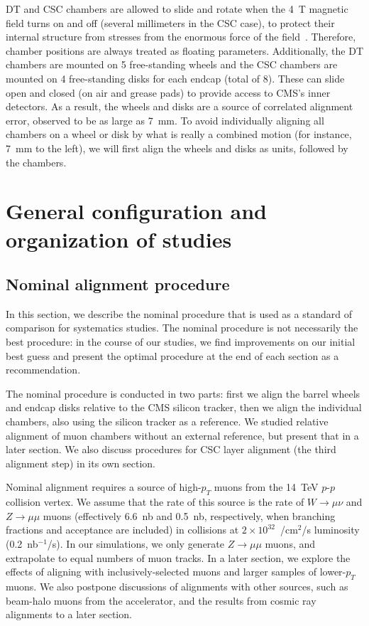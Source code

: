 \documentclass[12pt]{article}
\begin{document}
DT and CSC chambers are allowed to slide and rotate when the 4~T
magnetic field turns on and off (several millimeters in the CSC case),
to protect their internal structure from stresses from the enormous
force of the field~\cite{slide_in_field}.  Therefore, chamber
positions are always treated as floating parameters.  Additionally,
the DT chambers are mounted on 5 free-standing wheels and the CSC
chambers are mounted on 4 free-standing disks for each endcap (total
of 8).  These can slide open and closed (on air and grease pads) to
provide access to CMS's inner detectors.  As a result, the wheels and
disks are a source of correlated alignment error, observed to be
as large as 7~mm.  To avoid individually aligning all chambers on a
wheel or disk by what is really a combined motion (for instance, 7~mm
to the left), we will first align the wheels and disks as units,
followed by the chambers.

\section{General configuration and organization of studies}

\subsection{Nominal alignment procedure}

In this section, we describe the nominal procedure that is used as a
standard of comparison for systematics studies.  The nominal procedure
is not necessarily the best procedure: in the course of our studies,
we find improvements on our initial best guess and present the optimal
procedure at the end of each section as a recommendation.

The nominal procedure is conducted in two parts: first we align the
barrel wheels and endcap disks relative to the CMS silicon tracker,
then we align the individual chambers, also using the silicon tracker
as a reference.  We studied relative alignment of muon chambers
without an external reference, but present that in a later section.
We also discuss procedures for CSC layer alignment (the third
alignment step) in its own section.

Nominal alignment requires a source of high-$p_T$ muons from the
14~TeV $p$-$p$ collision vertex.  We assume that the rate of this
source is the rate of $W\to\mu\nu$ and $Z\to\mu\mu$ muons (effectively
6.6~nb and 0.5~nb, respectively, when branching fractions and
acceptance are included) in collisions at $2\times
10^{32}$~/cm$^2$/s luminosity (0.2~nb$^{-1}$/s).  In our simulations,
we only generate $Z\to\mu\mu$ muons, and extrapolate to equal numbers
of muon tracks.  In a later section, we explore the effects of
aligning with inclusively-selected muons and larger samples of
lower-$p_T$ muons.  We also postpone discussions of alignments with
other sources, such as beam-halo muons from the accelerator, and
the results from cosmic ray alignments to a later section.
\end{document}
